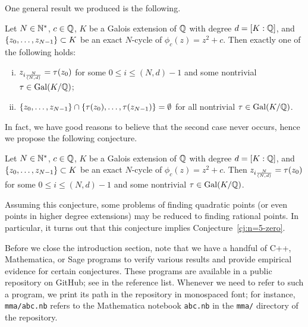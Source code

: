 One general result we produced is the following.

\newcommand{\nd}{\frac{N}{(N, d)}}

\begin{theorem}
  Let $N \in \mathbb{N}^*$, $c \in \mathbb{Q}$, $K$ be a Galois extension of $\mathbb{Q}$ with
  degree $d = [K : \mathbb{Q}]$, and $\left\{z_0, \dots, z_{N-1}\right\} \subset K$ be
  an exact $N$-cycle of $\phi_c(z) = z^2 + c$. Then exactly one of the
  following holds:
  \begin{enumerate}[(i)]
  \item $z_{i\nd} = \t(z_0)$ for some $0 \le i \le (N, d)-1$ and some
    nontrivial $\tau \in \mathrm{Gal}(K/\mathbb{Q})$;

  \item $\left\{z_0, \dots, z_{N-1}\right\} \cap \left\{\tau(z_0), \dots,
      \tau(z_{N-1})\right\} = \emptyset$ for all nontrivial $\tau \in \mathrm{Gal}(K/\mathbb{Q})$.
  \end{enumerate}
\end{theorem}

In fact, we have good reasons to believe that the second case never
occurs, hence we propose the following conjecture.

\begin{conjecture}
  \label{cj:galois-conjugate}
  Let $N \in \mathbb{N}^*$, $c \in \mathbb{Q}$, $K$ be a Galois extension of $\mathbb{Q}$ with
  degree $d = [K : \mathbb{Q}]$, and $\left\{z_0, \dots, z_{N-1}\right\} \subset K$ be
  an exact $N$-cycle of $\phi_c(z) = z^2 + c$. Then $z_{i\nd} =
  \t(z_0)$ for some $0 \le i \le (N, d)-1$ and some nontrivial $\tau \in
  \mathrm{Gal}(K/\mathbb{Q})$.
\end{conjecture}

Assuming this conjecture, some problems of finding quadratic points
(or even points in higher degree extensions) may be reduced to finding
rational points. In particular, it turns out that this conjecture
implies Conjecture~\ref{cj:n=5-zero}.

Before we close the introduction section, note that we have a handful
of C++, Mathematica, or Sage programs to verify various results and
provide empirical evidence for certain conjectures. These programs are
available in a public repository on GitHub; see \cite{src} in the
reference list. Whenever we need to refer to such a program, we print
its path in the repository in monospaced font; for instance,
\texttt{mma/abc.nb} refers to the Mathematica notebook \texttt{abc.nb}
in the \texttt{mma/} directory of the repository.

